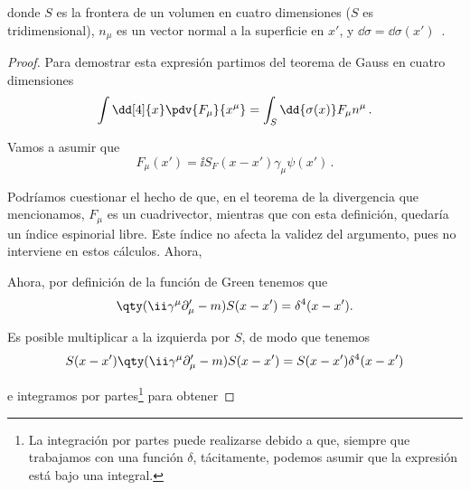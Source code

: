 \noindent donde $S$ es la frontera de un volumen en cuatro dimensiones ($S$ es tridimensional), $n_\mu$ es un vector normal a la superficie en $x'$, y $\dd{\sigma} = \dd{\sigma(x')}$ \,.

\begin{proof}
Para demostrar esta expresión partimos del teorema de Gauss en cuatro dimensiones
%
\begin{equation}
	\int \dd[4]{x} \pdv{F_\mu}{x^\mu} = \int_S \dd{\sigma(x)} F_\mu n^\mu \,.
	\label{eq:tmaGauss4D}
\end{equation}

Vamos a asumir que
%
\begin{equation}
	F_\mu(x') = \ii S_F(x-x') \gamma_\mu \psi(x') \,.
\end{equation}

Podríamos cuestionar el hecho de que, en el teorema de la divergencia que mencionamos, $F_\mu$ es un cuadrivector, mientras que con esta definición, quedaría un índice espinorial libre. Este índice no afecta la validez del argumento, pues no interviene en estos cálculos. Ahora,
%

Ahora, por definición de la función de Green tenemos que
%
\begin{equation}
	\qty(\ii \gamma^\mu \partial'_\mu - m )S(x-x') = \delta^4(x-x').
\end{equation}

Es posible multiplicar a la izquierda por $S$, de modo que tenemos
%
\begin{equation}
	S(x-x') \qty(\ii \gamma^\mu \partial'_\mu - m)S(x-x') = S(x-x')\delta^4(x-x')
\end{equation}

\noindent e integramos por partes\footnote{La integración por partes puede realizarse debido a que, siempre que trabajamos con una función $\delta$, tácitamente, podemos asumir que la expresión está bajo una integral.} para obtener
%


\end{proof}
